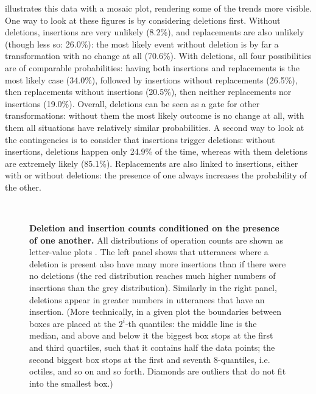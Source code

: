 \documentclass[a4paper,fleqn]{cas-dc}
\begin{document}
 illustrates this data with a mosaic plot,
rendering some of the trends more visible. One way to look at these
figures is by considering deletions first. Without deletions, insertions
are very unlikely (8.2\%), and replacements are also unlikely (though
less so: 26.0\%): the most likely event without deletion is by far a
transformation with no change at all (70.6\%). With deletions, all four
possibilities are of comparable probabilities: having both insertions
and replacements is the most likely case (34.0\%), followed by
insertions without replacements (26.5\%), then replacements without
insertions (20.5\%), then neither replacements nor insertions (19.0\%).
Overall, deletions can be seen as a gate for other transformations:
without them the most likely outcome is no change at all, with them all
situations have relatively similar probabilities. A second way to look
at the contingencies is to consider that insertions trigger deletions:
without insertions, deletions happen only 24.9\% of the time, whereas
with them deletions are extremely likely (85.1\%). Replacements are also
linked to insertions, either with or without deletions: the presence of
one always increases the probability of the other.

\begin{figure}
  \centering
  ~
  \caption[Deletion and insertion counts conditioned on the presence of one another]{
  \textbf{Deletion and insertion counts conditioned on the presence of one another.}
  All distributions of operation counts are shown as letter-value plots \citep{hofmann_letter-value_2011}.
  The left panel shows that utterances where a deletion is present also have many more insertions than if there were no deletions (the red distribution reaches much higher numbers of insertions than the grey distribution).
  Similarly in the right panel, deletions appear in greater numbers in utterances that have an insertion.
  (More technically, in a given plot the boundaries between boxes are placed at the $2^i$-th quantiles:
  the middle line is the median, and above and below it the biggest box stops at the first and third quartiles, such that it contains half the data points;
  the second biggest box stops at the first and seventh 8-quantiles, i.e. octiles, and so on and so forth.
  Diamonds are outliers that do not fit into the smallest box.)
  }
  \label{fig:gistr-insdel-lv}
\end{figure}
\end{document}
